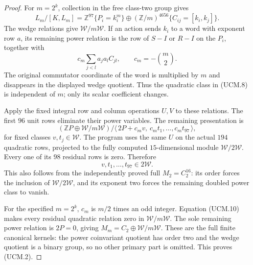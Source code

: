 \begin{proof}
For $m=2^k$, collection in the free class-two group gives
\[
 L_m/[K,L_m]
    =\mathbb Z^{97}\{P_i=k_i^m\}
        \oplus (\mathbb Z/m)^{4656}\{C_{ij}=[k_i,k_j]\}.
                                                        \tag{UCM.7}
\]
The wedge relations give $\mathcal W/m\mathcal W$.
If an action sends $k_i$ to a word with exponent row $a$,
its remaining power relation is the row of $S-I$ or $R-I$
on the $P_i$, together with
\[
 c_m\sum_{j<l}a_ja_lC_{jl},
                   \qquad c_m=-\binom m2.
                                                        \tag{UCM.8}
\]
The original commutator coordinate of the word is multiplied
by $m$ and disappears in the displayed wedge quotient.
Thus the quadratic class in (UCM.8) is independent of $m$;
only its scalar coefficient changes.

Apply the fixed integral row and column operations $U,V$
to these relations. The first $96$ unit rows eliminate
their power variables. The remaining presentation is
\[
 (\mathbb Z P\oplus\mathcal W/m\mathcal W)\big/
       \langle\,2P+c_m v,\ c_m t_1,\ldots,c_m t_{97}\,\rangle,
                                                        \tag{UCM.9}
\]
for fixed classes $v,t_j\in\mathcal W$. The program
 uses the same $U$ on
the actual $194$ quadratic rows, projected to the fully
computed $15$-dimensional module $\mathcal W/2\mathcal W$.
Every one of its $98$ residual rows is zero. Therefore
\[
                       v,t_1,\ldots,t_{97}\in2\mathcal W.
                                                        \tag{UCM.10}
\]
This also follows from the independently proved full
$M_2=C_2^{16}$: its order forces the inclusion of
$\mathcal W/2\mathcal W$, and its exponent two forces
the remaining doubled power class to vanish.

For the specified $m=2^k$, $c_m$ is $m/2$ times an odd integer.
Equation (UCM.10) makes every residual quadratic relation
zero in $\mathcal W/m\mathcal W$.
The sole remaining power relation is $2P=0$, giving
$M_m=C_2\oplus\mathcal W/m\mathcal W$.
These are the full finite canonical kernels: the power
coinvariant quotient has order two and the wedge quotient
is a binary group, so no other primary part is omitted.
This proves (UCM.2).


\end{proof}
